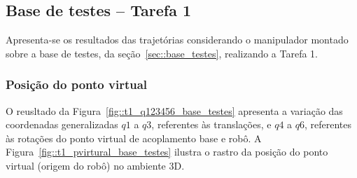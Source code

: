 \subsection{Base de testes -- Tarefa 1} \label{sec::res_testes}

Apresenta-se os resultados das trajetórias considerando o manipulador montado
sobre a base de testes, da seção~\ref{sec::base_testes}, realizando a Tarefa 1.

\subsubsection{Posição do ponto virtual}

O reusltado da Figura~\ref{fig::t1_q123456_base_testes} apresenta a variação das
coordenadas generalizadas $q1$ a $q3$, referentes às translações, e $q4$ a $q6$,
referentes às rotações do ponto virtual de acoplamento base e robô. A
Figura~\ref{fig::t1_pvirtural_base_testes} ilustra o rastro da posição do ponto
virtual (origem do robô) no ambiente 3D.

